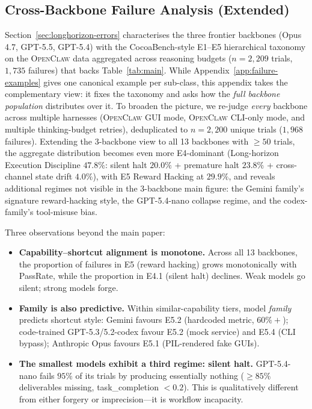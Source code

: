 \documentclass{llmxive}
\begin{document}
\subsection{Cross-Backbone Failure Analysis (Extended)}
\label{app:failure-cross}

Section~\ref{sec:longhorizon-errors} characterises the three frontier backbones (Opus 4.7, GPT-5.5, GPT-5.4) with the CocoaBench-style E1--E5 hierarchical taxonomy on the \textsc{OpenClaw} data aggregated across reasoning budgets ($n{=}2{,}209$ trials, $1{,}735$ failures) that backs Table~\ref{tab:main}. While Appendix~\ref{app:failure-examples} gives one canonical example per sub-class, this appendix takes the complementary view: it fixes the taxonomy and asks how the \emph{full backbone population} distributes over it. To broaden the picture, we re-judge \emph{every} backbone across multiple harnesses (\textsc{OpenClaw} GUI mode, \textsc{OpenClaw} CLI-only mode, and multiple thinking-budget retries), deduplicated to $n{=}2{,}200$ unique trials ($1{,}968$ failures). Extending the 3-backbone view to all 13 backbones with $\geq{}50$ trials, the aggregate distribution becomes even more E4-dominant (Long-horizon Execution Discipline $47.8\%$: silent halt $20.0\%$ + premature halt $23.8\%$ + cross-channel state drift $4.0\%$), with E5 Reward Hacking at $29.9\%$, and reveals additional regimes not visible in the 3-backbone main figure: the Gemini family's signature reward-hacking style, the GPT-5.4-nano collapse regime, and the codex-family's tool-misuse bias.

Three observations beyond the main paper:

\begin{itemize}[leftmargin=1.2em,itemsep=2pt,topsep=2pt]
\item \textbf{Capability--shortcut alignment is monotone.} Across all 13 backbones, the proportion of failures in E5 (reward hacking) grows monotonically with PassRate, while the proportion in E4.1 (silent halt) declines. Weak models go silent; strong models forge.
\item \textbf{Family is also predictive.} Within similar-capability tiers, model \emph{family} predicts shortcut style: Gemini favours E5.2 (hardcoded metric, $60\%{+}$); code-trained GPT-5.3/5.2-codex favour E5.2 (mock service) and E5.4 (CLI bypass); Anthropic Opus favours E5.1 (PIL-rendered fake GUIs).
\item \textbf{The smallest models exhibit a third regime: silent halt.} GPT-5.4-nano fails $95\%$ of its trials by producing essentially nothing ($\geq$$85\%$ deliverables missing, task\_completion $<0.2$). This is qualitatively different from either forgery or imprecision---it is workflow incapacity.
\end{itemize}
\end{document}
